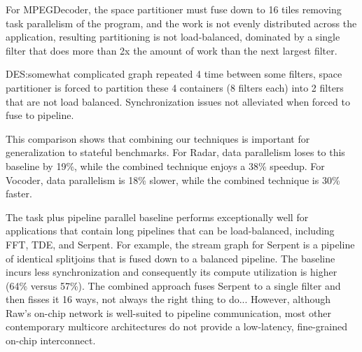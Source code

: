 For MPEGDecoder, the space partitioner must fuse down to 16 tiles removing task
parallelism of the program, and the work is not evenly distributed
across the application, resulting partitioning is not load-balanced,
dominated by a single filter that does more than 2x the amount of work
than the next largest filter.

DES:somewhat complicated graph repeated 4 time between some filters,
space partitioner is forced to partition these 4 containers (8 filters
each) into 2 filters that are not load balanced.  Synchronization
issues not alleviated when forced to fuse to pipeline.

This comparison shows that combining our techniques is important for
generalization to stateful benchmarks.  For Radar, data parallelism
loses to this baseline by 19\%, while the combined technique enjoys a
38\% speedup. For Vocoder, data parallelism is 18\% slower, while the
combined technique is 30\% faster.

The task plus pipeline parallel baseline performs exceptionally well
for applications that contain long pipelines that can be
load-balanced, including FFT, TDE, and Serpent.  For example, the
stream graph for Serpent is a pipeline of identical splitjoins that is
fused down to a balanced pipeline.  The baseline incurs less
synchronization and consequently its compute utilization is higher
(64\% versus 57\%).  The combined approach fuses Serpent to a single
filter and then fisses it 16 ways, not
always the right thing to do... However, although Raw's on-chip
network is well-suited to pipeline communication, most other
contemporary multicore architectures do not provide a low-latency,
fine-grained on-chip interconnect.




